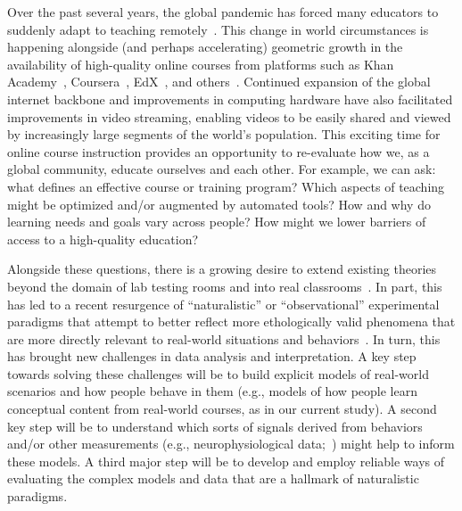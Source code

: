\documentclass[10pt]{article}
\providecommand{\DIFaddend}{} %
\DeclareRobustCommand{\DIFaddend}{\DIFOaddend \let\includegraphics\DIFOincludegraphics} %
\begin{document}
\DIFaddend Over the past several years, the global pandemic has forced many educators to
suddenly adapt to teaching remotely~\citep{MoseEtal21, ShimLee20, KawaEtal21,
Whal20}. This change in world circumstances is happening alongside (and perhaps
accelerating) geometric growth in the availability of high-quality online
courses from platforms such as Khan Academy~\citep{Khan04},
Coursera~\citep{Youn12}, EdX~\citep{Kolo13}, and others~\citep{RhoaEtal13}.
Continued expansion of the global internet backbone and improvements in
computing hardware have also facilitated improvements in video streaming,
enabling videos to be easily shared and viewed by increasingly large segments
of the world's population. This exciting time for online course instruction
provides an opportunity to re-evaluate how we, as a global community, educate
ourselves and each other. For example, we can ask: what defines an effective
course or training program? Which aspects of teaching might be optimized and/or
augmented by automated tools? How and why do learning needs and goals vary
across people? How might we lower barriers of access to a high-quality
education?

Alongside these questions, there is a growing desire to extend existing
theories beyond the domain of lab testing rooms and into real
classrooms~\citep{Kauf03}. In part, this has led to a recent resurgence of
``naturalistic'' or ``observational'' experimental paradigms that attempt to
better reflect more ethologically valid phenomena that are more directly
relevant to real-world situations and behaviors~\citep{NastEtal20}. In turn,
this has brought new challenges in data analysis and interpretation. A key step
towards solving these challenges will be to build explicit models of real-world
scenarios and how people behave in them (e.g., models of how people learn
conceptual content from real-world courses, as in our current study). A second
key step will be to understand which sorts of signals derived from behaviors
and/or other measurements (e.g., neurophysiological data;~\citealp{NguyEtal22,
MeshEtal20, PoulEtal17, BeviEtal19, DikkEtal17}) might help to inform these
models. A third major step will be to develop and employ reliable ways of
evaluating the complex models and data that are a hallmark of naturalistic
paradigms.
\end{document}
